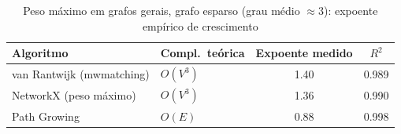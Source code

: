 \begin{table}[H]
    \centering
    \caption{Peso máximo em grafos gerais, grafo esparso (grau médio $\approx 3$): expoente empírico de crescimento}
    \label{tab:exp-general-weight}
    \renewcommand{\arraystretch}{1.25}
    \footnotesize
    \begin{tabularx}{\textwidth}{@{} X l c c @{}}
        \toprule
        \textbf{Algoritmo} & \textbf{Compl.\ teórica} & \textbf{Expoente medido} & \textbf{$R^2$} \\
        \midrule
        van Rantwijk (mwmatching) & $O(V^{3})$ & 1.40 & 0.989 \\
        NetworkX (peso máximo) & $O(V^{3})$ & 1.36 & 0.990 \\
        Path Growing & $O(E)$ & 0.88 & 0.998 \\
        \bottomrule
    \end{tabularx}
\end{table}
